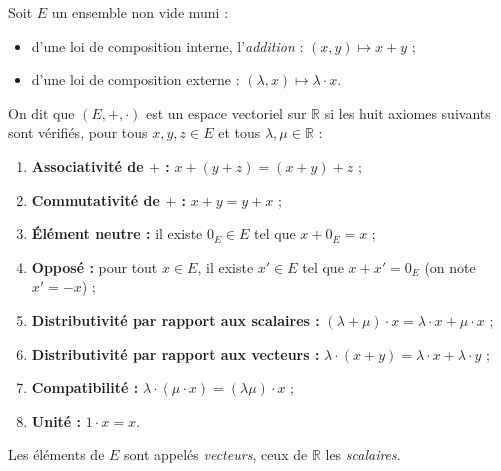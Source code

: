 \documentclass[11pt]{article}
\newcommand{\cle}[1]{{\popxbold\color{popdark}#1}}
\begin{document}
\begin{definition}
Soit $E$ un ensemble non vide muni :
\begin{itemize}
\item d'une loi de composition interne, l'\emph{addition} : $(x,y) \mapsto x + y$ ;
\item d'une loi de composition externe : $(\lambda, x) \mapsto \lambda \cdot x$.
\end{itemize}
On dit que $(E, +, \cdot)$ est un \cle{espace vectoriel sur $\mathbb{R}$} si les huit axiomes suivants sont vérifiés, pour tous $x, y, z \in E$ et tous $\lambda, \mu \in \mathbb{R}$ :
\begin{enumerate}
\item \textbf{Associativité de $+$ :} $x + (y + z) = (x + y) + z$ ;
\item \textbf{Commutativité de $+$ :} $x + y = y + x$ ;
\item \textbf{Élément neutre :} il existe $0_E \in E$ tel que $x + 0_E = x$ ;
\item \textbf{Opposé :} pour tout $x \in E$, il existe $x' \in E$ tel que $x + x' = 0_E$ (on note $x' = -x$) ;
\item \textbf{Distributivité par rapport aux scalaires :} $(\lambda + \mu) \cdot x = \lambda \cdot x + \mu \cdot x$ ;
\item \textbf{Distributivité par rapport aux vecteurs :} $\lambda \cdot (x + y) = \lambda \cdot x + \lambda \cdot y$ ;
\item \textbf{Compatibilité :} $\lambda \cdot (\mu \cdot x) = (\lambda \mu) \cdot x$ ;
\item \textbf{Unité :} $1 \cdot x = x$.
\end{enumerate}
Les éléments de $E$ sont appelés \emph{vecteurs}, ceux de $\mathbb{R}$ les \emph{scalaires}.
\end{definition}
\end{document}
